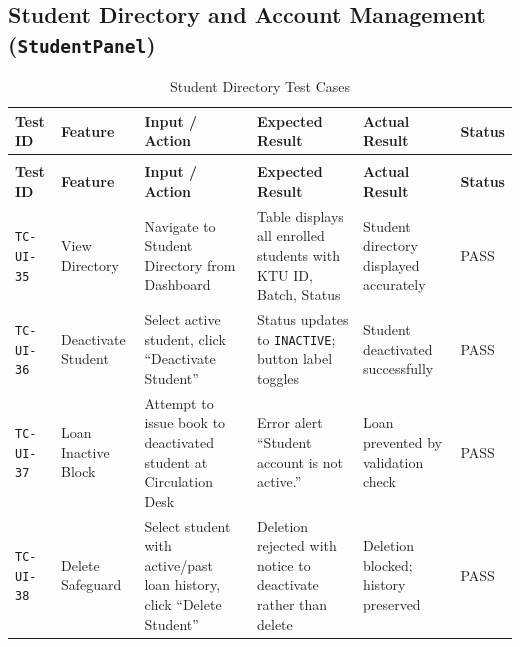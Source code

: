 \subsection{Student Directory and Account Management (\texttt{StudentPanel})}
{\footnotesize
\setlength{\tabcolsep}{3pt}
\begin{longtable}{>{\raggedright\arraybackslash}p{1.6cm} >{\raggedright\arraybackslash}p{2.1cm} >{\raggedright\arraybackslash}p{2.5cm} >{\raggedright\arraybackslash}p{3.1cm} >{\raggedright\arraybackslash}p{3.1cm} >{\centering\arraybackslash}p{1.4cm}}
\caption{Student Directory Test Cases} \label{tab:test_ui_stu} \\
\toprule
\textbf{Test ID} & \textbf{Feature} & \textbf{Input / Action} & \textbf{Expected Result} & \textbf{Actual Result} & \textbf{Status} \\
\midrule
\endfirsthead
\multicolumn{6}{c}{{\bfseries Table \thetable\ continued from previous page}} \\
\toprule
\textbf{Test ID} & \textbf{Feature} & \textbf{Input / Action} & \textbf{Expected Result} & \textbf{Actual Result} & \textbf{Status} \\
\midrule
\endhead
\bottomrule
\endfoot
\texttt{TC-UI-35} & View Directory & Navigate to Student Directory from Dashboard & Table displays all enrolled students with KTU ID, Batch, Status & Student directory displayed accurately & PASS \\
\midrule
\texttt{TC-UI-36} & Deactivate Student & Select active student, click ``Deactivate Student'' & Status updates to \texttt{INACTIVE}; button label toggles & Student deactivated successfully & PASS \\
\midrule
\texttt{TC-UI-37} & Loan Inactive Block & Attempt to issue book to deactivated student at Circulation Desk & Error alert ``Student account is not active.'' & Loan prevented by validation check & PASS \\
\midrule
\texttt{TC-UI-38} & Delete Safeguard & Select student with active/past loan history, click ``Delete Student'' & Deletion rejected with notice to deactivate rather than delete & Deletion blocked; history preserved & PASS \\
\end{longtable}
}

